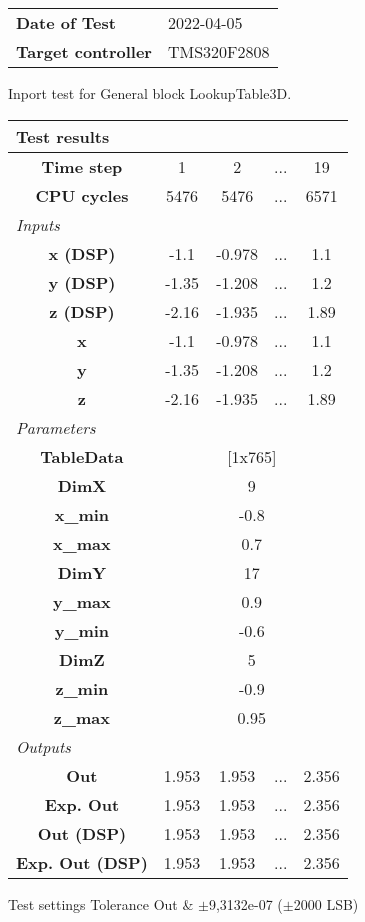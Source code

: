 \begin{tabular}{l l}
\textbf{Date of Test} & 2022-04-05 \tabularnewline
\textbf{Target controller} & TMS320F2808 \tabularnewline
\end{tabular}
\vspace{1ex}
Inport test for General block LookupTable3D.

\vspace{1em}
\begin{tabularx}{\textwidth}{|c|c|c|>{\centering\arraybackslash}X|c|}
\hline
\multicolumn{5}{|l|}{\cellcolor[gray]{0.8}\textbf{Test results}} \tabularnewline \hline
\textbf{Time step} & 1 & 2 & ... & 19 \tabularnewline \hline
\textbf{CPU cycles} & 5476 & 5476 & ... & 6571 \tabularnewline \hline
\multicolumn{5}{|l|}{\cellcolor[gray]{0.9}\textit{Inputs}} \tabularnewline \hline
\textbf{x (DSP)} & -1.1 & -0.978 & ... & 1.1 \tabularnewline \hline
\textbf{y (DSP)} & -1.35 & -1.208 & ... & 1.2 \tabularnewline \hline
\textbf{z (DSP)} & -2.16 & -1.935 & ... & 1.89 \tabularnewline \hline
\textbf{x} & -1.1 & -0.978 & ... & 1.1 \tabularnewline \hline
\textbf{y} & -1.35 & -1.208 & ... & 1.2 \tabularnewline \hline
\textbf{z} & -2.16 & -1.935 & ... & 1.89 \tabularnewline \hline
\multicolumn{5}{|l|}{\cellcolor[gray]{0.9}\textit{Parameters}} \tabularnewline \hline
\textbf{TableData} & \multicolumn{4}{c|}{[1x765]} \tabularnewline \hline
\textbf{DimX} & \multicolumn{4}{c|}{9} \tabularnewline \hline
\textbf{x\_min} & \multicolumn{4}{c|}{-0.8} \tabularnewline \hline
\textbf{x\_max} & \multicolumn{4}{c|}{0.7} \tabularnewline \hline
\textbf{DimY} & \multicolumn{4}{c|}{17} \tabularnewline \hline
\textbf{y\_max} & \multicolumn{4}{c|}{0.9} \tabularnewline \hline
\textbf{y\_min} & \multicolumn{4}{c|}{-0.6} \tabularnewline \hline
\textbf{DimZ} & \multicolumn{4}{c|}{5} \tabularnewline \hline
\textbf{z\_min} & \multicolumn{4}{c|}{-0.9} \tabularnewline \hline
\textbf{z\_max} & \multicolumn{4}{c|}{0.95} \tabularnewline \hline
\multicolumn{5}{|l|}{\cellcolor[gray]{0.9}\textit{Outputs}} \tabularnewline \hline
\textbf{Out} & 1.953 & 1.953 & ... & 2.356 \tabularnewline \hline
\textbf{Exp. Out} & 1.953 & 1.953 & ... & 2.356 \tabularnewline \hline
\textbf{Out (DSP)} & 1.953 & 1.953 & ... & 2.356 \tabularnewline \hline
\textbf{Exp. Out (DSP)} & 1.953 & 1.953 & ... & 2.356 \tabularnewline \hline
\end{tabularx}
\vspace{1ex}

\begin{XtoCtabular}{Test settings}
Tolerance Out & $\pm$9,3132e-07 ($\pm$2000 LSB) \tabularnewline \hline
\end{XtoCtabular}

